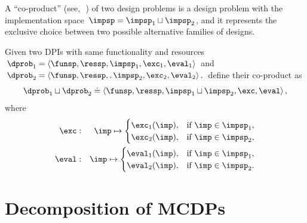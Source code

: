 A ``co-product'' (see,~\eg\,\cite[Section 2.4]{spivak14category})
of two design problems is a design problem with the implementation
space~$\impsp=\impsp_{1}\sqcup\impsp_{2}$, and it represents the
exclusive choice between two possible alternative families of designs.
\begin{definition}[Co-product]
\label{def:parallel-1}Given two DPIs with same functionality and
resources $\dprob_{1}=\left\langle \funsp,\ressp,\impsp_{1},\exc_{1},\eval_{1}\right\rangle $
and $\dprob_{2}=\left\langle \funsp,\ressp,,\impsp_{2},\exc_{2},\eval_{2}\right\rangle ,$
define their co-product as
\[
\dprob_{1}\sqcup\dprob_{2}\doteq\left\langle \funsp,\ressp,\impsp_{1}\sqcup\impsp_{2},\exc,\eval\right\rangle ,
\]
where
\begin{eqnarray}
\exc & : & \imp\mapsto\begin{cases}
\exc_{1}(\imp), & \text{if }\imp\in\impsp_{1},\\
\exc_{2}(\imp), & \text{if }\imp\in\impsp_{2},
\end{cases}\label{eq:dppar-exec-1}\\
\eval & : & \imp\mapsto\begin{cases}
\eval_{1}(\imp), & \text{if }\imp\in\impsp_{1},\\
\eval_{2}(\imp), & \text{if }\imp\in\impsp_{2}.
\end{cases}\nonumber
\end{eqnarray}

\end{definition}

\section{Decomposition of MCDPs\label{sec:Decomposition}}

